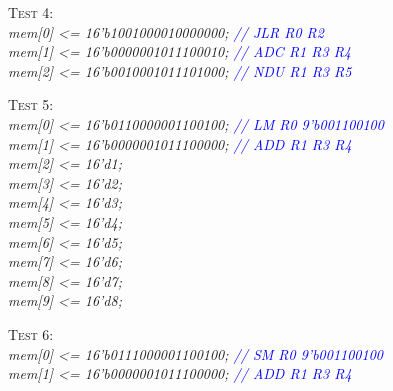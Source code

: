\documentclass[11pt,fleqn,oneside]{book} %
\begin{document}
\vspace{1cm}

\textsc{Test 4:} \\
\textit{
mem[0] <= 16'b1001000010000000; \textcolor{blue}{// JLR  R0  R2 } \\
mem[1] <= 16'b0000001011100010; \textcolor{blue}{// ADC  R1  R3  R4} \\
mem[2] <= 16'b0010001011101000;	\textcolor{blue}{// NDU  R1  R3  R5} \\
}

\vspace{1cm}

\textsc{Test 5:} \\
\textit{
mem[0] <= 16'b0110000001100100; \textcolor{blue}{// LM   R0  9'b001100100} \\
mem[1] <= 16'b0000001011100000; \textcolor{blue}{// ADD  R1  R3  R4} \\
mem[2] <= 16'd1; \\
mem[3] <= 16'd2; \\
mem[4] <= 16'd3; \\
mem[5] <= 16'd4; \\
mem[6] <= 16'd5; \\
mem[7] <= 16'd6; \\
mem[8] <= 16'd7; \\
mem[9] <= 16'd8; \\
}

\vspace{1cm}

\textsc{Test 6:} \\
\textit{
mem[0] <= 16'b0111000001100100; \textcolor{blue}{// SM  R0  9'b001100100} \\
mem[1] <= 16'b0000001011100000; \textcolor{blue}{// ADD  R1  R3  R4} \\
}
\end{document}

